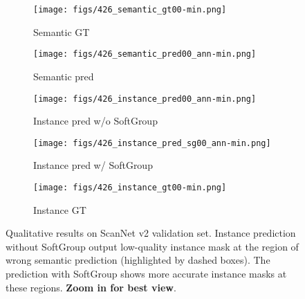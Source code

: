 \documentclass[10pt,twocolumn,letterpaper]{article}
\begin{document}
\begin{figure*}
		\begin{subfigure}{0.195\textwidth}
			\texttt{[image: figs/426\_semantic\_gt00-min.png]}
			\caption*{Semantic GT}
		\end{subfigure}
		\begin{subfigure}{0.195\textwidth}
			\texttt{[image: figs/426\_semantic\_pred00\_ann-min.png]}
			\caption*{Semantic pred}
		\end{subfigure}
		\begin{subfigure}{0.195\textwidth}
			\texttt{[image: figs/426\_instance\_pred00\_ann-min.png]}
			\caption*{Instance pred w/o SoftGroup}
		\end{subfigure}
		\begin{subfigure}{0.195\textwidth}
			\texttt{[image: figs/426\_instance\_pred\_sg00\_ann-min.png]}
			\caption*{Instance pred w/ SoftGroup}
		\end{subfigure}
		\begin{subfigure}{0.195\textwidth}
			\texttt{[image: figs/426\_instance\_gt00-min.png]}
			\caption*{Instance GT}
		\end{subfigure}
		\caption{Qualitative results on ScanNet v2 validation set. Instance prediction without SoftGroup output low-quality instance mask at the region of wrong semantic prediction (highlighted by dashed boxes). The prediction with SoftGroup shows more accurate instance masks at these regions. \textbf{Zoom in for best view}.}
		\label{fig:quanlitative_res}
	\end{figure*}
	
\end{document}
